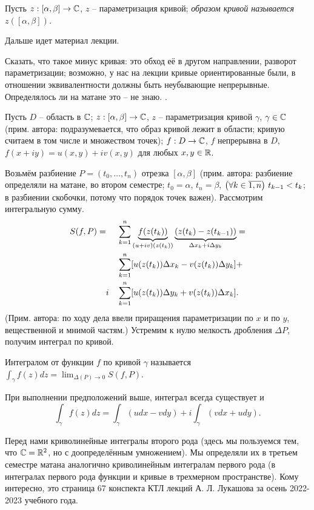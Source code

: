 \begin{definition}
	Пусть $z: [\alpha, \beta] \to \mathbb{C}$, $z$ -- параметризация кривой; \it{образом кривой} называется $z([\alpha, \beta])$.
\end{definition}

Дальше идет материал лекции.

{\color{red} Сказать, что такое минус кривая: это обход её в другом направлении, разворот параметризации; возможно, у нас на лекции кривые ориентированные были, в отношении эквивалентности должны быть неубывающие непрерывные. Определялось ли на матане это -- не знаю. }.

Пусть $D$ -- область в $\mathbb{C}$; $z: [\alpha, \beta] \to \mathbb{C}$, $z$ -- параметризация кривой $\gamma$, $\gamma \in \mathbb{C}$ (прим. автора: подразумевается, что образ кривой лежит в области; кривую считаем в том числе и множеством точек); $f: D \to \mathbb{C}$, $f$ непрерывна в $D$, $f(x + iy) = u(x, y) + iv(x, y)$ для любых $x, y \in \mathbb{R}$.

Возьмём разбиение $P = (t_0, \ldots, t_n)$ отрезка $[\alpha, \beta]$ (прим. автора: разбиение определяли на матане, во втором семестре; $t_0 = \alpha$, $t_n = \beta$, $\mathopen{}\left( \forall k \in \overline{1, n} \right)\mathclose{} \,\, t_{k - 1} < t_k$; в разбиении скобочки, потому что порядок точек важен). Рассмотрим интегральную сумму.
\[
	\begin{aligned}
		S(f, P) = & && \sum_{k = 1}^n \underbrace{f(z(t_k))}_{(u+iv)(z(t_k))} \underbrace{\mathopen{}\left( z(t_k) - z(t_{k - 1}) \right)\mathclose{}}_{\Delta x_k + i \Delta y_k} = \\
		& && \sum_{k = 1}^n \mathopen{}\left[ u(z(t_k)) \Delta x_k - v(z(t_k)) \Delta y_k \right]\mathclose{} + \\
		& i && \sum_{k = 1}^n \mathopen{}\left[ u(z(t_k)) \Delta y_k + v(z(t_k)) \Delta x_k \right]\mathclose{}.
	\end{aligned}
\]
(Прим. автора: по ходу дела ввели приращения параметризации по $x$ и по $y$, вещественной и мнимой частям.) Устремим к нулю мелкость дробления $\Delta P$, получим интеграл по кривой.

\begin{definition}
	Интегралом от функции $f$ по кривой $\gamma$ называется $\int_\gamma f(z) dz = \lim_{\Delta(P) \to 0} S(f, P)$.
\end{definition}
\begin{note}
	При выполнении предположений выше, интеграл всегда существует и
	\[
		\int_\gamma f(z) dz = \int_\gamma (u dx - v dy) + i \int_\gamma (v dx + u dy).
	\]
\end{note}
\begin{anote}
	Перед нами криволинейные интегралы второго рода (здесь мы пользуемся тем, что $\mathbb{C} = \mathbb{R}^2$, но с доопределённым умножением). Мы определяли их в третьем семестре матана аналогично криволинейным интегралам первого рода (в интегралах первого рода функции и кривые в трехмерном пространстве). Кому интересно, это страница 67 конспекта КТЛ лекций А. Л. Лукашова за осень 2022-2023 учебного года.
\end{anote}

